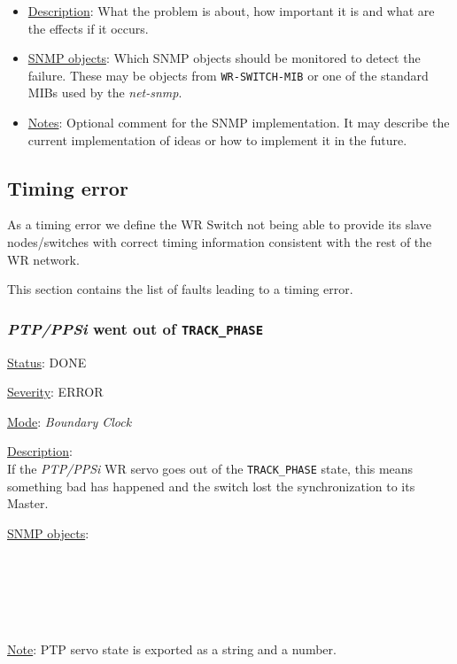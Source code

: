 \begin{itemize}[leftmargin=0pt]
	\item [] \underline{Description}: What the problem is about, how important it
		is and what are the effects if it occurs.
	\item [] \underline{SNMP objects}: Which SNMP objects should be monitored to
		detect the failure. These may be objects from \texttt{WR-SWITCH-MIB} or one
		of the standard MIBs used by the \emph{net-snmp}.
	\item [] \underline{Notes}: Optional comment for the SNMP implementation. It
		may describe the current implementation of ideas or how to implement it in
		the future.
\end{itemize}

\subsection{Timing error}
\label{sec:timing_fail}
As a timing error we define the WR Switch not being able to provide its slave
nodes/switches with correct timing information consistent with the rest of the
WR network.

\noindent This section contains the list of faults leading to a timing error.

\subsubsection{\bf \emph{PTP/PPSi} went out of \texttt{TRACK\_PHASE}}
		\label{fail:timing:ppsi_track_phase}
		\begin{pck_descr}
			\item [] \underline{Status}: DONE
			\item [] \underline{Severity}: ERROR
			\item [] \underline{Mode}: \emph{Boundary Clock}
			\item [] \underline{Description}:\\
				If the \emph{PTP/PPSi} WR servo goes out of the \texttt{TRACK\_PHASE}
				state, this means something bad has happened and the switch lost the
				synchronization to its Master.
			\item [] \underline{SNMP objects}:\\
				{\footnotesize
				\\
				\\
				\\
				 \\
				 \\
				 }

			\item [] \underline{Note}: PTP servo state is exported as a string and a number.
		\end{pck_descr}

